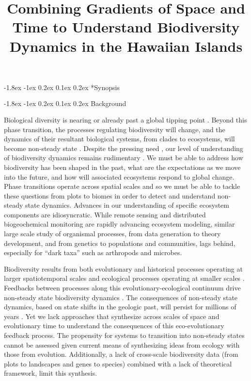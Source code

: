 \documentclass[11pt]{article}
\title{Combining Gradients of Space and Time to Understand Biodiversity Dynamics in the Hawaiian Islands \vspace{-1.5ex}}
\author{}
\date{}
\makeatletter
\renewcommand\section{\@startsection{section}{1}{\z@}%
                                  {-1.8ex \@plus -1ex \@minus 0.2ex}%
                                  {0.1ex \@plus 0.2ex}%
                                  {\normalfont\Large\bfseries}}
\makeatother
\begin{document}
\maketitle
\thispagestyle{fancy} 
\vspace{-4em}


\section*{Synopsis}


\section{Background}

Biological diversity is nearing or already past a global tipping point
\citep{barnosky2012}. Beyond this phase transition, the processes
regulating biodiversity will change, and the dynamics of their
resultant biological systems, from clades to ecosystems, will become
non-steady state \citep{barnosky2012}.  Despite the pressing
need , our level of understanding of biodiversity dynamics remains
rudimentary .  We must be able to address how biodiversity has been
shaped in the past, what are the expectations as we move into the
future, and how will associated ecosystems respond to global
change. Phase transitions operate across spatial scales and so we must
be able to tackle these questions from plots to biomes in order to
detect and understand non-steady state dynamics. Advances in our
understanding of specific ecosystem components are idiosyncratic.
While remote sensing and distributed biogeochemical monitoring
\citep{asner2012, NEON} are rapidly advancing ecosystem modeling, similar
large scale study of organismal processes, from data generation to
theory development, and from genetics to populations and communities,
lags behind, especially for ``dark taxa'' such as arthropods and
microbes.

Biodiversity results from both evolutionary and historical processes
operating at larger spatiotemporal scales and ecological processes
operating at smaller scales \citep{lessard2012}.  Feedbacks between
processes along this evolutionary-ecological continuum drive
non-steady state biodiversity dynamics \citep{brown1971,
  ricklefs2006neutral, rominger2015}. The consequences of non-steady
state dynamics, based on state shifts in the geologic past, will
persist for millions of years \citep{Erwin1998}. Yet we lack
approaches that synthesize across scales of space and evolutionary
time to understand the consequences of this eco-evolutionary feedback
process.  The propensity for systems to transition into non-steady
states cannot be assessed given current means of synthesizing ideas
from ecology with those from evolution.  Additionally, a lack of
cross-scale biodiversity data (from plots to landscapes and genes to
species) combined with a lack of theoretical framework, limit this
synthesis.
\end{document}

